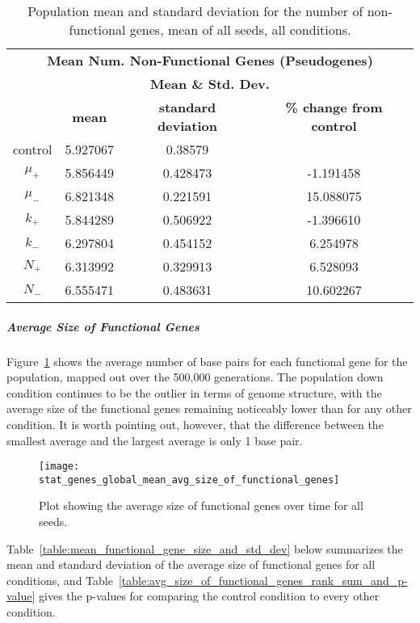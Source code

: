 \begin{table}[h]
	\centering
	\begin{tabular}{|c|c|c|c|}
		\hline
		\multicolumn{4}{c}{\Large \textbf{Mean Num. Non-Functional Genes (Pseudogenes)}} \\
		\multicolumn{4}{c}{\Large \textbf{Mean \& Std. Dev.}} \\
		\hline
		& \textbf{mean} & \textbf{standard deviation} & \textbf{\% change from control} \\
		\hline
		control & 5.927067 & 0.38579 & \textemdash \\ 
		\hline
		$\mu_+$ & 5.856449 & 0.428473 & -1.191458 \\ 
		\hline
		$\mu_-$ & 6.821348 & 0.221591 & 15.088075 \\ 
		\hline
		$k_+$ & 5.844289 & 0.506922 & -1.396610 \\ 
		\hline
		$k_-$ & 6.297804 & 0.454152 & 6.254978 \\ 
		\hline
		$N_+$ & 6.313992 & 0.329913 & 6.528093 \\ 
		\hline
		$N_-$ & 6.555471 & 0.483631 & 10.602267 \\ 
		\hline
	\end{tabular}
	\caption[Number of Non-functional Genes - Mean \& St. Dev.]{Population mean and standard deviation for the number of non-functional genes, mean of all seeds, all conditions.}
	\label{table:non-functional_genes_mean_std_dev}
\end{table}

\subparagraph{Average Size of Functional Genes}\label{sec:average_size_functional_genes}
Figure~\ref{fig:mean_functional_gene_size} shows the average number of base pairs for each functional gene for the population, mapped out over the 500,000 generations. The population down condition continues to be the outlier in terms of genome structure, with the average size of the functional genes remaining noticeably lower than for any other condition. It is worth pointing out, however, that the difference between the smallest average and the largest average is only 1 base pair. 
\begin{figure}[H]
	\centering
	\texttt{[image: stat\_genes\_global\_mean\_avg\_size\_of\_functional\_genes]}
	\caption[Average size of functional genes]{Plot showing the average size of functional genes over time for all seeds.}
	\label{fig:mean_functional_gene_size}
\end{figure}
Table~\ref{table:mean_functional_gene_size_and_std_dev} below summarizes the mean and standard deviation of the average size of functional genes for all conditions, and Table~\ref{table:avg_size_of_functional_genes_rank_sum_and_p-value} gives the p-values for comparing the control condition to every other condition. 

